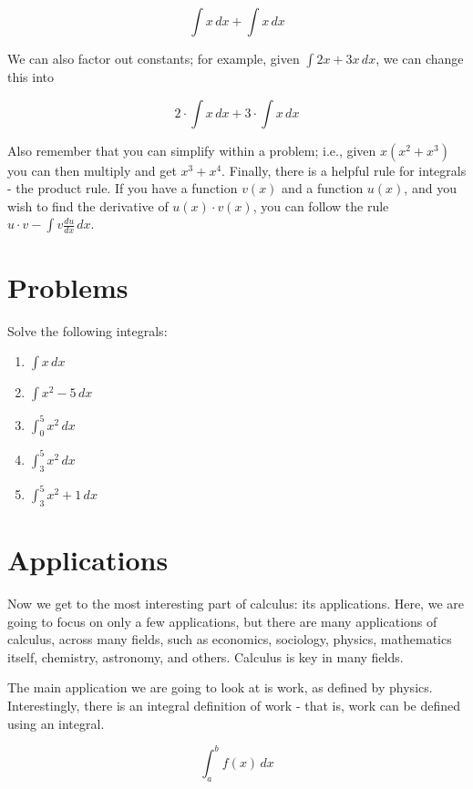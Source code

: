 \documentclass{memoir}
\begin{document}
\begin{equation*}
    \int x \, dx + \int x \, dx
\end{equation*}

We can also factor out constants; for example, given $\int 2x + 3x \, dx$, we can change this into 

\begin{equation*}
    2\cdot \int x \, dx + 3 \cdot \int x \, dx
\end{equation*}

Also remember that you can simplify within a problem; i.e., given $x(x^2 + x^3)$ you can then multiply and get $x^3 + x^4$. 
Finally, there is a helpful rule for integrals - the product rule. 
If you have a function $v(x)$ and a function $u(x)$, and you wish to find the derivative of $u(x)\cdot v(x)$, you can follow the rule $u\cdot v - \int v\frac{du}{dx}\, dx$.
\section{Problems}
Solve the following integrals:

\begin{enumerate}
    \item $\int x \, dx$
    \item $\int x^2-5 \, dx$
    \item $\int^5_0 x^2 \, dx$
    \item $\int^5_3 x^2 \, dx$
    \item $\int^5_3 x^2 + 1 \, dx$
\end{enumerate}

\section{Applications}

Now we get to the most interesting part of calculus: its applications. 
Here, we are going to focus on only a few applications, but there are many applications of calculus, across many fields, such as economics, sociology, physics, mathematics itself, chemistry, astronomy, and others. 
Calculus is key in many fields.

The main application we are going to look at is work, as defined by physics. 
Interestingly, there is an integral definition of work - that is, work can be defined using an integral.

\begin{equation*}
    \int^b_a f(x) \, dx
\end{equation*}
\end{document}

